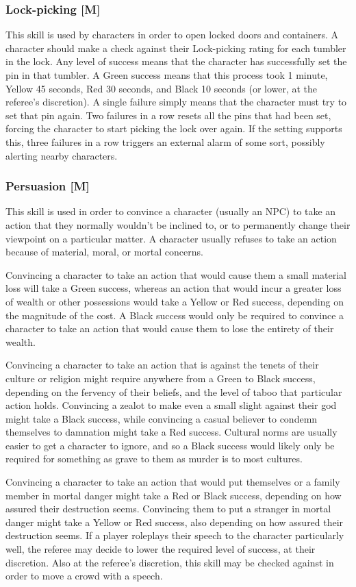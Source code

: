 \documentclass[oneside]{book}
\begin{document}
\begin{multicols}{2}
\subsubsection{Lock-picking [M]}
This skill is used by characters in order to open locked doors and containers. A character should make a check against their Lock-picking rating for each tumbler in the lock. Any level of success means that the character has successfully set the pin in that tumbler. A Green success means that this process took 1 minute, Yellow 45 seconds, Red 30 seconds, and Black 10 seconds (or lower, at the referee's discretion). A single failure simply means that the character must try to set that pin again. Two failures in a row resets all the pins that had been set, forcing the character to start picking the lock over again. If the setting supports this, three failures in a row triggers an external alarm of some sort, possibly alerting nearby characters.
\subsubsection{Persuasion [M]}
This skill is used in order to convince a character (usually an NPC) to take an action that they normally wouldn't be inclined to, or to permanently change their viewpoint on a particular matter. A character usually refuses to take an action because of material, moral, or mortal concerns. 

Convincing a character to take an action that would cause them a small material loss will take a Green success, whereas an action that would incur a greater loss of wealth or other possessions would take a Yellow or Red success, depending on the magnitude of the cost. A Black success would only be required to convince a character to take an action that would cause them to lose the entirety of their wealth. 

Convincing a character to take an action that is against the tenets of their culture or religion might require anywhere from a Green to Black success, depending on the fervency of their beliefs, and the level of taboo that particular action holds. Convincing a zealot to make even a small slight against their god might take a Black success, while convincing a casual believer to condemn themselves to damnation might take a Red success. Cultural norms are usually easier to get a character to ignore, and so a Black success would likely only be required for something as grave to them as murder is to most cultures.

Convincing a character to take an action that would put themselves or a family member in mortal danger might take a Red or Black success, depending on how assured their destruction seems. Convincing them to put a stranger in mortal danger might take a Yellow or Red success, also depending on how assured their destruction seems. 
If a player roleplays their speech to the character particularly well, the referee may decide to lower the required level of success, at their discretion. Also at the referee's discretion, this skill may be checked against in order to move a crowd with a speech.


\end{multicols}
\end{document}
